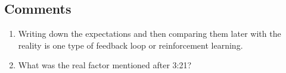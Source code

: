 \documentclass[a4paper,12pt]{article}
\begin{document}
\subsection*{ Comments }

\begin{enumerate}

	\item Writing down the expectations and then comparing them later with the reality is one type of feedback loop or reinforcement learning.

	\item What was the real factor mentioned after 3:21?

\end{enumerate}



\newpage
\end{document}
